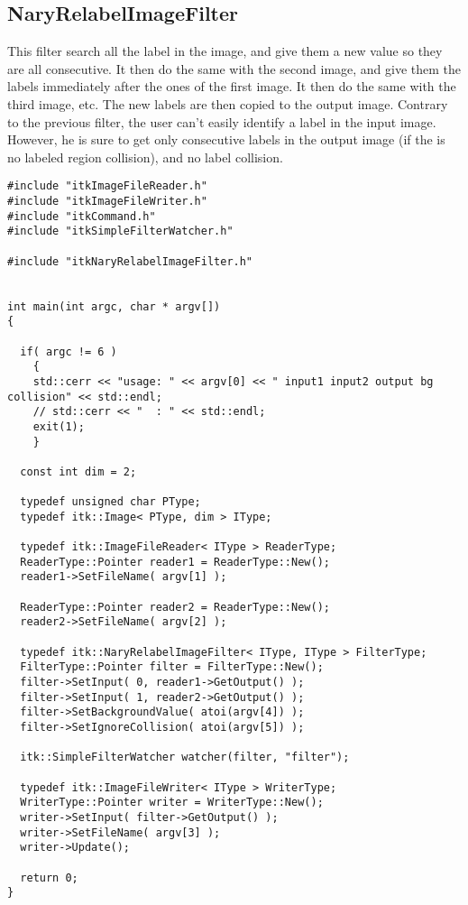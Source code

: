 \documentclass{InsightArticle}
\begin{document}
\subsection{NaryRelabelImageFilter}

This filter search all the label in the image, and give them a new value so they are all
consecutive. It then do the same with the second image, and give them the labels immediately
after the ones of the first image. It then do the same with the third image, etc.
The new labels are then copied to the output image.
Contrary to the previous filter, the user can't easily identify a label in the input image.
However, he is sure to get only consecutive labels in the output image (if the is no labeled
region collision), and no label collision.

\small \begin{verbatim}
#include "itkImageFileReader.h"
#include "itkImageFileWriter.h"
#include "itkCommand.h"
#include "itkSimpleFilterWatcher.h"

#include "itkNaryRelabelImageFilter.h"


int main(int argc, char * argv[])
{

  if( argc != 6 )
    {
    std::cerr << "usage: " << argv[0] << " input1 input2 output bg collision" << std::endl;
    // std::cerr << "  : " << std::endl;
    exit(1);
    }

  const int dim = 2;
  
  typedef unsigned char PType;
  typedef itk::Image< PType, dim > IType;

  typedef itk::ImageFileReader< IType > ReaderType;
  ReaderType::Pointer reader1 = ReaderType::New();
  reader1->SetFileName( argv[1] );

  ReaderType::Pointer reader2 = ReaderType::New();
  reader2->SetFileName( argv[2] );

  typedef itk::NaryRelabelImageFilter< IType, IType > FilterType;
  FilterType::Pointer filter = FilterType::New();
  filter->SetInput( 0, reader1->GetOutput() );
  filter->SetInput( 1, reader2->GetOutput() );
  filter->SetBackgroundValue( atoi(argv[4]) );
  filter->SetIgnoreCollision( atoi(argv[5]) );

  itk::SimpleFilterWatcher watcher(filter, "filter");

  typedef itk::ImageFileWriter< IType > WriterType;
  WriterType::Pointer writer = WriterType::New();
  writer->SetInput( filter->GetOutput() );
  writer->SetFileName( argv[3] );
  writer->Update();

  return 0;
}
\end{verbatim} \normalsize
\end{document}
